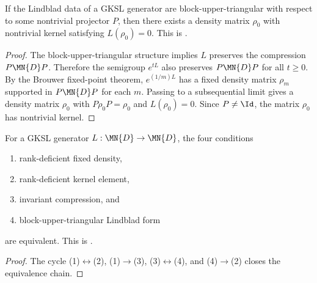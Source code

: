 \begin{theorem}
    \label{thm:blockUpperTriangular_implies_rankDeficient}
    \leanok
    If the Lindblad data of a GKSL generator are block-upper-triangular
    with respect to some nontrivial projector $P$,
    then there exists a density matrix $\rho_0$ with nontrivial kernel
    satisfying $L(\rho_0)=0$.
    This is \cite[Proposition~7.6, (4)$\Rightarrow$(2)]{Wolf2012Quantum}.
\end{theorem}

\begin{proof}
    \leanok
    The block-upper-triangular structure implies $L$ preserves the
    compression $P\MN{D}P$.
    Therefore the semigroup $e^{tL}$ also preserves $P\MN{D}P$
    for all $t\ge0$.
    By the Brouwer fixed-point theorem, $e^{(1/m)L}$ has a fixed
    density matrix $\rho_m$ supported in $P\MN{D}P$ for each $m$.
    Passing to a subsequential limit gives a density matrix
    $\rho_0$ with $P\rho_0P=\rho_0$ and $L(\rho_0)=0$.
    Since $P\neq\Id$, the matrix $\rho_0$ has nontrivial kernel.
\end{proof}

\begin{theorem}
    \label{thm:wolf_prop_7_6_full}
    \leanok
    For a GKSL generator $L:\MN{D}\to\MN{D}$, the four conditions
    \begin{enumerate}
        \item rank-deficient fixed density,
        \item rank-deficient kernel element,
        \item invariant compression, and
        \item block-upper-triangular Lindblad form
    \end{enumerate}
    are equivalent.
    This is \cite[Proposition~7.6]{Wolf2012Quantum}.
\end{theorem}

\begin{proof}\leanok
    The cycle (1)$\leftrightarrow$(2), (1)$\to$(3),
    (3)$\leftrightarrow$(4), and (4)$\to$(2) closes
    the equivalence chain.
\end{proof}

